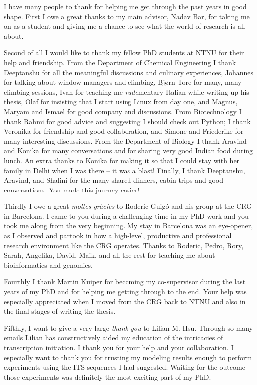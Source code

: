 I have many people to thank for helping me get through the past years in good
shape. First I owe a great thanks to my main advisor, Nadav Bar, for taking me
on as a student and giving me a chance to see what the world of research is all
about.

Second of all I would like to thank my fellow PhD students at NTNU for their
help and friendship. From the Department of Chemical Engineering I thank
Deeptanshu for all the meaningful discussions and culinary experiences,
Johannes for talking about window managers and climbing, Bjørn-Tore for many,
many climbing sessions, Ivan for teaching me \textit{rude}mentary Italian while
writing up his thesis, Olaf for insisting that I start using Linux from day
one, and Magnus, Maryam and Ismael for good company and discussions. From
Biotechnology I thank Rahmi for good advice and suggesting I should check out
Python; I thank Veronika for friendship and good collaboration, and Simone and
Friederike for many interesting discussions. From the Department of Biology I
thank Aravind and Konika for many conversations and for sharing very good
Indian food during lunch. An extra thanks to Konika for making it so that I
could stay with her family in Delhi when I was there -- it was a blast!
Finally, I thank Deeptanshu, Aravind, and Shalini for the many shared dinners,
cabin trips and good conversations. You made this journey easier!

Thirdly I owe a great \textit{moltes gràcies} to Roderic Guigó and his group at
the CRG in Barcelona. I came to you during a challenging time in my PhD work
and you took me along from the very beginning. My stay in Barcelona was an
eye-opener, as I observed and partook in how a high-level, productive and
professional research environment like the CRG operates. Thanks to Roderic,
Pedro, Rory, Sarah, Angelika, David, Maik, and all the rest for teaching me
about bioinformatics and genomics.

Fourthly I thank Martin Kuiper for becoming my co-supervisor during the last
years of my PhD and for helping me getting through to the end. Your help was
especially appreciated when I moved from the CRG back to NTNU and also in the
final stages of writing the thesis.

Fifthly, I want to give a very large \textit{thank you} to Lilian M. Hsu.
Through so many emails Lilian has constructively aided my education of the
intricacies of transcription initiation. I thank you for your help and your
collaboration. I especially want to thank you for trusting my modeling results
enough to perform experiments using the ITS-sequences I had suggested. Waiting
for the outcome those experiments was definitely the most exciting part of my
PhD.

